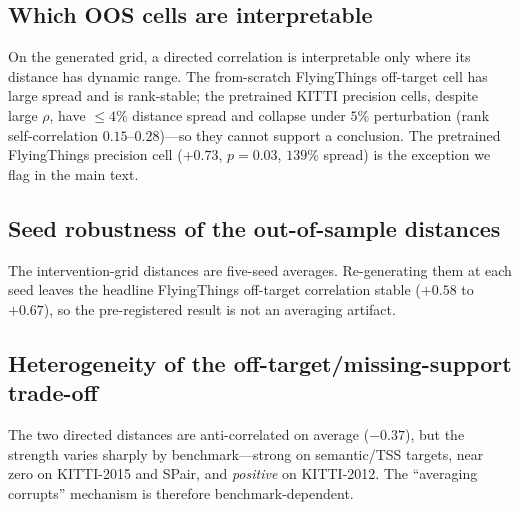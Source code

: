 \documentclass[runningheads]{llncs}
\newcommand{\dtb}{d_{T\to B}}
\newcommand{\dbt}{d_{B\to T}}
\begin{document}
\subsection{Which OOS cells are interpretable}
On the generated grid, a directed correlation is interpretable only where its
distance has dynamic range. The from-scratch FlyingThings off-target cell has
large spread and is rank-stable; the pretrained KITTI precision cells, despite
large $\rho$, have $\le 4\%$ distance spread and collapse under $5\%$
perturbation (rank self-correlation $0.15$--$0.28$)---so they cannot support a
conclusion. The pretrained FlyingThings precision cell ($+0.73$, $p{=}0.03$,
$139\%$ spread) is the exception we flag in the main text.
\begin{table}[h]\centering\small

\caption{Intervention-grid precision cells: correlation, exact $n{=}9$ $p$,
relative distance spread, and rank self-correlation under $5\%$ noise.}
\label{tab:new_ttarm}
\end{table}

\subsection{Seed robustness of the out-of-sample distances}
The intervention-grid distances are five-seed averages. Re-generating them at
each seed leaves the headline FlyingThings off-target correlation stable
($+0.58$ to $+0.67$), so the pre-registered result is not an averaging
artifact.
\begin{table}[h]\centering\small

\caption{From-scratch off-target correlation by distance-estimation seed.}
\label{tab:new_seedaudit}
\end{table}

\subsection{Heterogeneity of the off-target/missing-support trade-off}
The two directed distances are anti-correlated on average ($-0.37$), but the
strength varies sharply by benchmark---strong on semantic/TSS targets, near
zero on KITTI-2015 and SPair, and \emph{positive} on KITTI-2012. The
``averaging corrupts'' mechanism is therefore benchmark-dependent.
\begin{table}[h]\centering\small

\caption{Within-context Spearman between $\dtb$ and $\dbt$ across sources,
per benchmark.}
\label{tab:new_anticorr}
\end{table}
\end{document}
